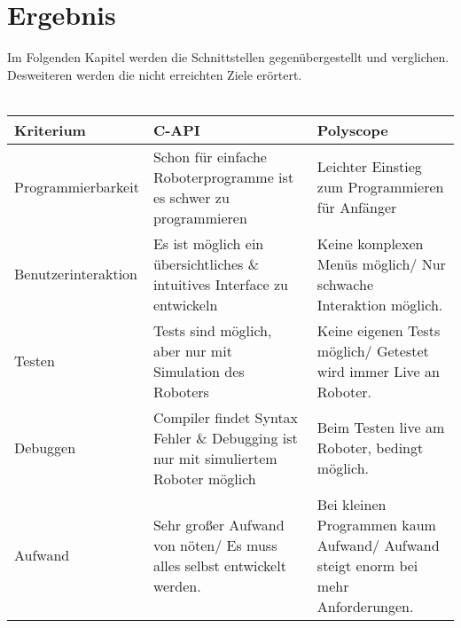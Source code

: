 \chapter{Ergebnis}
\label{sec:ErreichteErgebnisse}

Im Folgenden Kapitel werden die Schnittstellen gegenübergestellt und verglichen. Desweiteren werden die nicht erreichten Ziele erörtert.
\\\\
\begin{tabular}{|l|p{}|p{}|}
	\hline
	\textbf{Kriterium} & \textbf{C-API} & \textbf{Polyscope} 
	\\ \hline \hline 
	Programmierbarkeit & Schon für einfache Roboterprogramme ist es schwer zu programmieren & Leichter Einstieg zum Programmieren für Anfänger
	\\ \hline
	Benutzerinteraktion &  Es ist möglich ein übersichtliches \& intuitives Interface zu entwickeln & 
	Keine komplexen Menüs möglich/ Nur schwache Interaktion möglich.
	\\ \hline
	Testen & Tests sind möglich, aber nur mit Simulation des Roboters & Keine eigenen Tests möglich/ Getestet wird immer Live an Roboter.
	\\ \hline
	Debuggen & Compiler findet Syntax Fehler \& Debugging ist nur mit simuliertem Roboter möglich & Beim Testen live am Roboter, bedingt möglich.
	\\ \hline
	Aufwand & Sehr großer Aufwand von nöten/ Es muss alles selbst entwickelt werden. & \label{krit_polyscope_aufwand}
	Bei kleinen Programmen kaum Aufwand/ Aufwand steigt enorm bei mehr Anforderungen.\\ \hline
\end{tabular}
\label{tab:vgl_interfaces_first}

